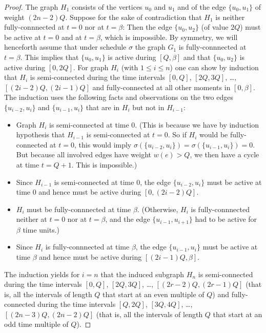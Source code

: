 \documentclass[runningheads]{llncs}
\numberwithin{equation}{section}
\newcommand{\set}[1]{\{ #1 \}}
\begin{document}
\begin{proof}
The graph $H_1$ consists of the vertices $u_0$ and $u_1$ and of the edge $\{u_0, u_1\}$ of weight $(2n-2)Q$.
Suppose for the sake of contradiction that $H_1$ is neither fully-connnected at $t=0$ nor at $t=\beta$:
Then the edge $\{u_0, u_2\}$ (of value $2Q$) must be active at $t=0$ and at $t=\beta$, which is impossible.
By symmetry, we will henceforth assume that under schedule $\sigma$ the graph $G_1$ is fully-connnected at $t=\beta$.
This implies that $\{u_0, u_1\}$ is active during $[Q,\beta]$ and that $\{u_0, u_2\}$ is active during $[0,2Q]$.
For graph $H_i$ (with $1\le i\le n$) one can show by induction that $H_i$ is semi-connected
during the time intervals $[0,Q]$, $[2Q,3Q]$, \dots, $[(2i-2)Q,(2i-1)Q]$ and fully-connected at all
other moments in $[0,\beta]$.
The induction uses the following facts and observations on the two edges $\set{u_{i-2}, u_i}$ and $\set{u_{i-1},u_i}$ 
that are in $H_i$ but not in $H_{i-1}$:
\begin{itemize}
\item Graph $H_i$ is semi-connected at time $0$. (This is because we have by induction hypothesis that $H_{i-1}$ is semi-connected at $t=0$. So if $H_i$ would be fully-connected at $t=0$, this would imply $\sigma(\{u_{i-2}, u_i\}) = \sigma(\{u_{i-1}, u_i\}) = 0$. But because all involved edges have weight $w(e) > Q$, we then have a cycle at time $t = Q+1$. This is impossible.)
\item Since $H_{i-1}$ is semi-connected at time $0$, the edge $\{u_{i-2},u_i\}$ must be active at time $0$
and hence must be active during $[0,(2i-2)Q]$.
\item $H_i$ must be fully-connnected at time $\beta$. (Otherwise, $H_i$ is fully-connnected neither 
at $t=0$ nor at $t=\beta$, and the edge $\{u_{i-1},u_{i+1}\}$ had to be active for $\beta$ time units.)
\item Since $H_i$ is fully-connnected at time $\beta$, the edge $\{u_{i-1},u_i\}$ must be active at time $\beta$
and hence must be active during $[(2i-1)Q,\beta]$.
\end{itemize}
The induction yields for $i=n$ that the induced subgraph $H_n$ is semi-connected during the time intervals 
$[0,Q]$, $[2Q,3Q]$, \dots, $[(2r-2)Q,(2r-1)Q]$ (that is, all the intervals of length $Q$ that start at an even multiple of $Q$)
and fully-connected during the time intervals $[Q,2Q]$, $[3Q,4Q]$, \dots, $[(2n-3)Q,(2n-2)Q]$ (that is, all the 
intervals of length $Q$ that start at an odd time multiple of $Q$).


\end{proof}
\end{document}
